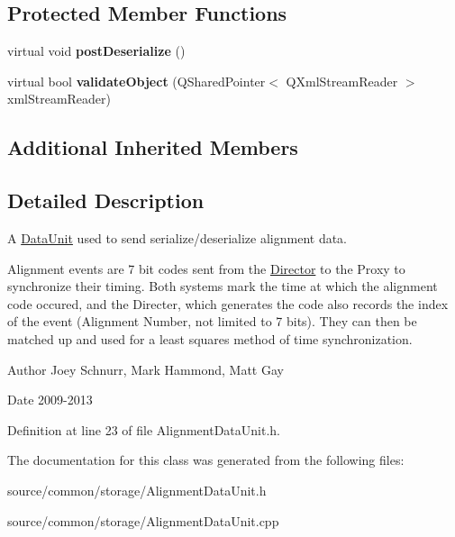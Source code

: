 \subsection*{Protected Member Functions}
\begin{DoxyCompactItemize}
\item 
\hypertarget{class_picto_1_1_alignment_data_unit_a302e7cfa120a9341432312a03bac9574}{virtual void {\bfseries post\-Deserialize} ()}\label{class_picto_1_1_alignment_data_unit_a302e7cfa120a9341432312a03bac9574}

\item 
\hypertarget{class_picto_1_1_alignment_data_unit_a730480877303cd29441b9107fde8e2ba}{virtual bool {\bfseries validate\-Object} (Q\-Shared\-Pointer$<$ Q\-Xml\-Stream\-Reader $>$ xml\-Stream\-Reader)}\label{class_picto_1_1_alignment_data_unit_a730480877303cd29441b9107fde8e2ba}

\end{DoxyCompactItemize}
\subsection*{Additional Inherited Members}


\subsection{Detailed Description}
A \hyperlink{class_picto_1_1_data_unit}{Data\-Unit} used to send serialize/deserialize alignment data. 

Alignment events are 7 bit codes sent from the \hyperlink{class_director}{Director} to the Proxy to synchronize their timing. Both systems mark the time at which the alignment code occured, and the Directer, which generates the code also records the index of the event (Alignment Number, not limited to 7 bits). They can then be matched up and used for a least squares method of time synchronization. \begin{DoxyAuthor}{Author}
Joey Schnurr, Mark Hammond, Matt Gay 
\end{DoxyAuthor}
\begin{DoxyDate}{Date}
2009-\/2013 
\end{DoxyDate}


Definition at line 23 of file Alignment\-Data\-Unit.\-h.



The documentation for this class was generated from the following files\-:\begin{DoxyCompactItemize}
\item 
source/common/storage/Alignment\-Data\-Unit.\-h\item 
source/common/storage/Alignment\-Data\-Unit.\-cpp\end{DoxyCompactItemize}

